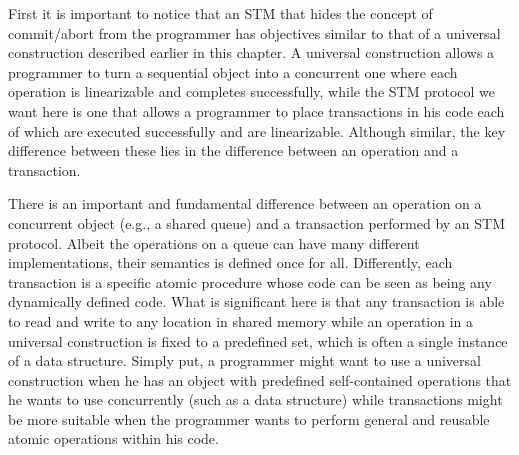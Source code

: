 First it is important to notice that an STM that hides the concept of
commit/abort from the programmer has objectives similar to that of a
universal construction described earlier in this chapter.
A universal construction allows a programmer to turn a sequential
object into a concurrent one where each operation is linearizable
and completes successfully, while
the STM protocol we want here is one that allows a programmer to place transactions
in his code each of which are executed successfully and are linearizable.
Although similar, the key difference between these lies in the
difference between an operation and a transaction.


There is an important and fundamental difference between an operation on 
a concurrent object (e.g.,  a shared queue) and a transaction performed
by an STM protocol. 
Albeit the operations on a queue can have many different implementations, 
their semantics is  defined once for all. 
Differently, each transaction is a specific  atomic procedure whose 
code can be  seen as being any dynamically  defined code.
What is significant here is that any transaction is  able to read and
write to  any location in shared  memory while an operation  in a universal
construction is fixed to a predefined set, which is often a single instance
of a  data structure.
Simply put, a programmer might want to use a universal construction when
he has an object with predefined self-contained operations that
he wants to use concurrently (such as a data structure) while transactions
might be more suitable when the programmer wants to perform general and reusable
atomic operations within his code.

